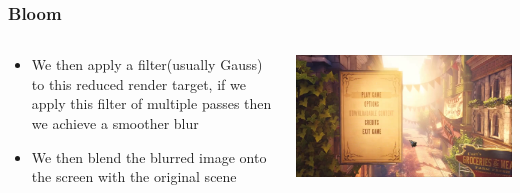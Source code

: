 \begin{frame}
	\frametitle{Bloom}
	\begin{columns}
		\begin{column}{0.5\textwidth}
			\begin{itemize}
				\item We then apply a filter(usually Gauss) to this reduced render target, if we apply this filter of multiple passes then we achieve a smoother blur
				\item We then blend the blurred image onto the screen with the original scene 
			\end{itemize}
		\end{column}
		\begin{column}{0.5\textwidth} 
			\begin{center}
				\includegraphics[width=\textwidth]{bloom}
			\end{center}
		\end{column}
	\end{columns}	
\end{frame}